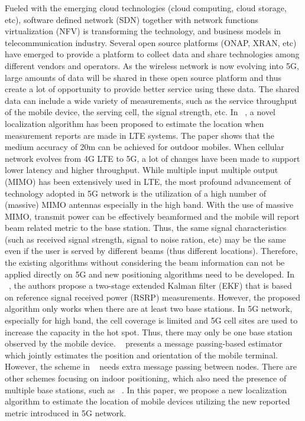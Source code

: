 \documentclass[conference, 10pt]{IEEEtran}
\begin{document}
\begin{NoHyper}
Fueled with the emerging cloud technologies (cloud computing, cloud storage, etc), software defined network (SDN) together with 
network functions virtualization (NFV) is transforming the technology, and business models in telecommunication industry.
Several open source platforms (ONAP, XRAN, etc) have emerged to provide a platform to collect data and share technologies among different 
vendors and operators. As the wireless network is now evolving into 5G, large amounts of data will be shared in these open source platform and thus create 
a lot of opportunity to provide better service using these data. The shared data can include a wide variety of measurements, such as the service throughput of the mobile 
device, the serving cell, the signal strength, etc. In ~\cite{Pantelis2016Localization}, a novel localization algorithm has been proposed to estimate 
the location when measurement reports are made in LTE systems. The paper shows that the medium accuracy of 20m can be achieved for outdoor mobiles. 
When cellular network evolves from 4G LTE to 5G, a lot of changes have been made to support lower latency and higher throughput. While multiple input multiple output (MIMO) has been extensively used in LTE, the most profound advancement of technology adopted in 5G
network is the utilization of a high number of (massive) MIMO antennas especially in the high band. With the use of massive MIMO, transmit power can be effectively beamformed and the mobile will report beam related metric to the base station. 
Thus, the same signal characteristics (such as received signal strength, signal to noise ration, etc) may be the same even if the user is served by different beams (thus different locations). Therefore, the existing algorithms without considering the beam information can not be 
applied directly on 5G and new positioning algorithms need to be developed. In ~\cite{Costca1} ~\cite{Costa2}, the authors propose a two-stage extended Kalman filter (EKF) that is based on reference signal received power (RSRP) measurements. However, the proposed algorithm only works when there are 
at least two base stations. In 5G network, especially for high band, the cell coverage is limited and 5G cell sites are used to increase the capacity in the hot spot. Thus, there may only be one base station observed by the mobile device.
 ~\cite{Mendrzik1} presents a message passing-based estimator which jointly estimates the position and orientation of the mobile terminal. However, the scheme in ~\cite{Mendrzik1} needs extra message passing between nodes.
There are other schemes focusing on indoor positioning, which also need the presence of multiple base stations, such as ~\cite{Obeidat1}.
In this paper, we propose a new localization algorithm to estimate the location of mobile devices utilizing the new reported metric introduced in 5G network.


\end{NoHyper}
\end{document}
